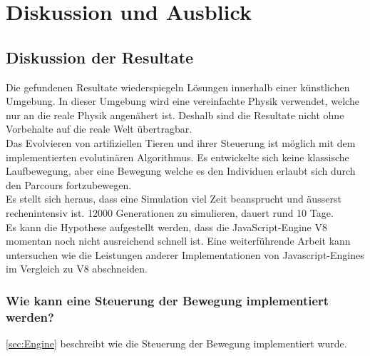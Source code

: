 %
%


\chapter{Diskussion und Ausblick\label{chap:perspective}}


  \section{Diskussion der Resultate\label{sec:diskRes}}

    Die gefundenen Resultate wiederspiegeln Lösungen innerhalb einer künstlichen Umgebung.
    In dieser Umgebung wird eine vereinfachte Physik verwendet, welche nur an die reale Physik angenähert ist.
    Deshalb sind die Resultate nicht ohne Vorbehalte auf die reale Welt übertragbar.
    \\
    Das Evolvieren von artifiziellen Tieren und ihrer Steuerung ist möglich mit dem implementierten evolutinären Algorithmus.
    Es entwickelte sich keine klassische Laufbewegung,
    aber eine Bewegung welche es den Individuen erlaubt sich durch den Parcours fortzubewegen.
    \\
    Es stellt sich heraus, dass eine Simulation viel Zeit beansprucht und äusserst rechenintensiv ist.
    12000 Generationen zu simulieren, dauert rund 10 Tage. \\
    Es kann die Hypothese aufgestellt werden, dass die JavaScript-Engine V8 momentan noch nicht ausreichend schnell ist.
    Eine weiterführende Arbeit kann untersuchen wie die Leistungen anderer Implementationen von Javascript-Engines im
    Vergleich zu V8 abschneiden.

    \subsection{Wie kann eine Steuerung der Bewegung implementiert werden?}
      \vref{sec:Engine} beschreibt wie die Steuerung der Bewegung implementiert wurde.

